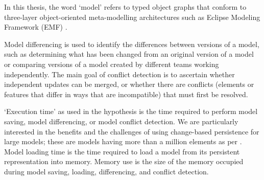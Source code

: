 In this thesis, the word ‘model’ refers to typed object graphs that conform to three-layer object-oriented meta-modelling architectures such as Eclipse Modeling Framework (EMF) \cite{eclipse2019emf}.

Model differencing is used to identify the differences between versions of a model, such as determining what has been changed from an original version of a model or comparing versions of a model created by different teams working independently. The main goal of conflict detection is to ascertain whether independent updates can be merged, or whether there are conflicts (elements or features that differ in ways that are incompatible) that must first be resolved.

‘Execution time’ as used in the hypothesis is the time required to perform model saving, model differencing, or model conflict detection. We are particularly interested in the benefits and the challenges of using change-based persistence for large models; these are models having more than a million elements as per \cite{daniel2016neoemf,DBLP:conf/models/Espinazo-PaganCM11}. Model loading time is the time required to load a model from its persistent representation into memory. Memory use is the size of the memory occupied during model saving, loading, differencing, and conflict detection.

